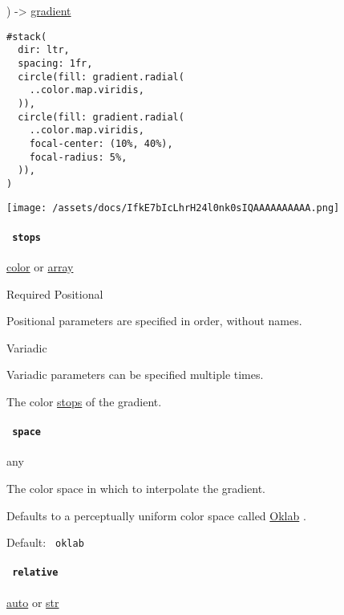 ) -\textgreater{} \href{/docs/reference/visualize/gradient/}{gradient}

\begin{verbatim}
#stack(
  dir: ltr,
  spacing: 1fr,
  circle(fill: gradient.radial(
    ..color.map.viridis,
  )),
  circle(fill: gradient.radial(
    ..color.map.viridis,
    focal-center: (10%, 40%),
    focal-radius: 5%,
  )),
)
\end{verbatim}

\texttt{[image: /assets/docs/IfkE7bIcLhrH24l0nk0sIQAAAAAAAAAA.png]}

\paragraph{\texorpdfstring{\texttt{\ stops\ }}{ stops }}\label{definitions-radial-stops}

\href{/docs/reference/visualize/color/}{color} {or}
\href{/docs/reference/foundations/array/}{array}

{Required} {{ Positional }}

\label{definitions-radial-stops-positional-tooltip}
Positional parameters are specified in order, without names.

{{ Variadic }}

\label{definitions-radial-stops-variadic-tooltip}
Variadic parameters can be specified multiple times.

The color \hyperref[stops]{stops} of the gradient.

\paragraph{\texorpdfstring{\texttt{\ space\ }}{ space }}\label{definitions-radial-space}

{ any }

The color space in which to interpolate the gradient.

Defaults to a perceptually uniform color space called
\href{/docs/reference/visualize/color/\#definitions-oklab}{Oklab} .

Default: \texttt{\ oklab\ }

\paragraph{\texorpdfstring{\texttt{\ relative\ }}{ relative }}\label{definitions-radial-relative}

\href{/docs/reference/foundations/auto/}{auto} {or}
\href{/docs/reference/foundations/str/}{str}


